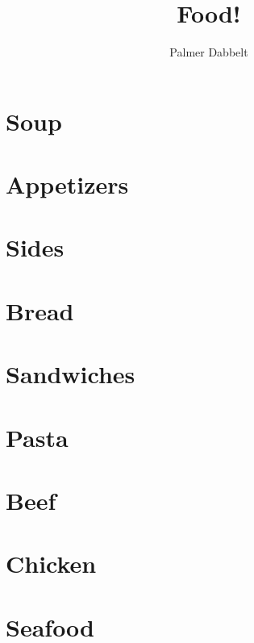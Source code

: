 \documentclass{book}
\author{Palmer Dabbelt}
\title{Food!}
\begin{document}
\maketitle
\tableofcontents
\contentsskip

\newcommand{\maketitle}{}
\renewcommand{\tableofcontents}{}
\newcommand{\author}[1]{}
\newcommand{\title}[1]{}
\renewcommand{\contentsskip}{}
\renewcommand{\bref}[1]{\ref{#1}}

\chapter{Soup}



\chapter{Appetizers}


\chapter{Sides}


\chapter{Bread}



\chapter{Sandwiches}



\chapter{Pasta}




\chapter{Beef}


\chapter{Chicken}




\chapter{Seafood}

\end{document}
